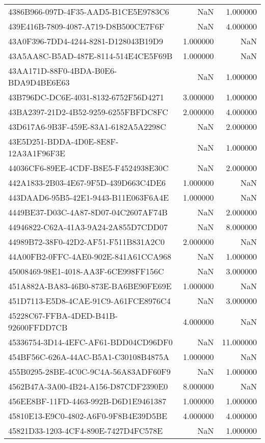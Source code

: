 \begin{tabular}{lrr}
4386B966-097D-4F35-AAD5-B1CE5E9783C6 & NaN & 1.000000 \\
439E416B-7809-4087-A719-D8B500CE7F6F & NaN & 4.000000 \\
43A0F396-7DD4-4244-8281-D128043B19D9 & 1.000000 & NaN \\
43A5AA8C-B5AD-487E-8114-514E4CE5F69B & 1.000000 & NaN \\
43AA171D-88F0-4BDA-B0E6-BDA9D4BE6E63 & NaN & 1.000000 \\
43B796DC-DC6E-4031-8132-6752F56D4271 & 3.000000 & 1.000000 \\
43BA2397-21D2-4B52-9259-6255FBFDC8FC & 2.000000 & 4.000000 \\
43D617A6-9B3F-459E-83A1-6182A5A2298C & NaN & 2.000000 \\
43E5D251-BDDA-4D0E-8E8F-12A3A1F96F3E & NaN & 1.000000 \\
44036CF6-89EE-4CDF-B8E5-F4524938E30C & NaN & 2.000000 \\
442A1833-2B03-4E67-9F5D-439D663C4DE6 & 1.000000 & NaN \\
443DAAD6-95B5-42E1-9443-B11E063F6A4E & 1.000000 & NaN \\
4449BE37-D03C-4A87-8D07-04C2607AF74B & NaN & 2.000000 \\
44946822-C62A-41A3-9A24-2A855D7CDD07 & NaN & 8.000000 \\
44989B72-38F0-42D2-AF51-F511B831A2C0 & 2.000000 & NaN \\
44A00FB2-0FFC-4AE0-902E-841A61CCA968 & NaN & 1.000000 \\
45008469-98E1-4018-AA3F-6CE998FF156C & NaN & 3.000000 \\
451A882A-BA83-46B0-873E-BA6BE90FE69E & 1.000000 & NaN \\
451D7113-E5D8-4CAE-91C9-A61FCE8976C4 & NaN & 3.000000 \\
45228C67-FFBA-4DED-B41B-92600FFDD7CB & 4.000000 & NaN \\
45336754-3D14-4EFC-AF61-BDD04CD96DF0 & NaN & 11.000000 \\
454BF56C-626A-44AC-B5A1-C30108B4875A & 1.000000 & NaN \\
455B0295-28BE-4C0C-9C4A-56A83ADF60F9 & NaN & 1.000000 \\
4562B47A-3A00-4B24-A156-D87CDF2390E0 & 8.000000 & NaN \\
456EE8BF-11FD-4463-992B-D6D1E9461387 & 1.000000 & 1.000000 \\
45810E13-E9C0-4802-A6F0-9F8B4E39D5BE & 4.000000 & 4.000000 \\
45821D33-1203-4CF4-890E-7427D4FC578E & NaN & 1.000000 \\

\end{tabular}
